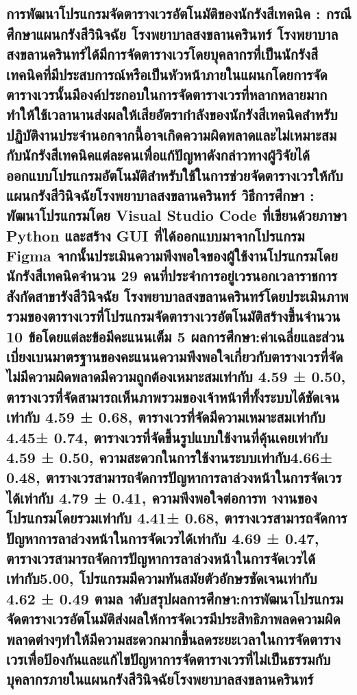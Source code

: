 \hspace{0cm}\subsection{การพัฒนาโปรแกรมจัดตารางเวรอัตโนมัติของนักรังสีเทคนิค : กรณีศึกษาแผนกรังสีวินิจฉัย โรงพยาบาลสงขลานครินทร์ โรงพยาบาลสงขลานครินทร์ได้มีการจัดตารางเวรโดยบุคลากรที่เป็นนักรังสีเทคนิคที่มีประสบการณ์หรือเป็นหัวหน้าภายในแผนกโดยการจัดตารางเวรนั้นมีองค์ประกอบในการจัดตารางเวรที่หลากหลายมากทำให้ใช้เวลานานส่งผลให้เสียอัตรากำลังของนักรังสีเทคนิคสำหรับปฏิบัติงานประจำนอกจากนี้อาจเกิดความผิดพลาดและไม่เหมาะสมกับนักรังสีเทคนิคแต่ละคนเพื่อแก้ปัญหาดังกล่าวทางผู้วิจัยได้ออกแบบโปรแกรมอัตโนมัติสำหรับใช้ในการช่วยจัดตารางเวรให้กับแผนกรังสีวินิจฉัยโรงพยาบาลสงขลานครินทร์ วิธีการศึกษา : พัฒนาโปรแกรมโดย Visual Studio Code ที่เขียนด้วยภาษา Python และสร้าง GUI ที่ได้ออกแบบมาจากโปรแกรม Figma จากนั้นประเมินความพึงพอใจของผู้ใช้งานโปรแกรมโดยนักรังสีเทคนิคจำนวน 29 คนที่ประจำการอยู่เวรนอกเวลาราชการสังกัดสาขารังสีวินิจฉัย โรงพยาบาลสงขลานครินทร์โดยประเมินภาพรวมของตารางเวรที่โปรแกรมจัดตารางเวรอัตโนมัติสร้างขึ้นจำนวน 10 ข้อโดยแต่ละข้อมีคะแนนเต็ม 5 ผลการศึกษา:ค่าเฉลี่ยและส่วนเบี่ยงเบนมาตรฐานของคะแนนความพึงพอใจเกี่ยวกับตารางเวรที่จัดไม่มีความผิดพลาดมีความถูกต้องเหมาะสมเท่ากับ 4.59 ± 0.50, ตารางเวรที่จัดสามารถเห็นภาพรวมของเจ้าหน้าที่ทั้งระบบได้ชัดเจนเท่ากับ 4.59 ± 0.68, ตารางเวรที่จัดมีความเหมาะสมเท่ากับ 4.45± 0.74, ตารางเวรที่จัดขึ้นรูปแบบใช้งานที่คุ้นเคยเท่ากับ 4.59 ± 0.50, ความสะดวกในการใช้งานระบบเท่ากับ4.66± 0.48, ตารางเวรสามารถจัดการปัญหาการลาล่วงหน้าในการจัดเวรได้เท่ากับ 4.79 ± 0.41, ความพึงพอใจต่อการท างานของโปรแกรมโดยรวมเท่ากับ 4.41± 0.68, ตารางเวรสามารถจัดการปัญหาการลาล่วงหน้าในการจัดเวรได้เท่ากับ 4.69 ± 0.47, ตารางเวรสามารถจัดการปัญหาการลาล่วงหน้าในการจัดเวรได้เท่ากับ5.00, โปรแกรมมีความทันสมัยตัวอักษรชัดเจนเท่ากับ 4.62 ± 0.49 ตามล าดับสรุปผลการศึกษา:การพัฒนาโปรแกรมจัดตารางเวรอัตโนมัติส่งผลให้การจัดเวรมีประสิทธิภาพลดความผิดพลาดต่างๆทำให้มีความสะดวกมากขึ้นลดระยะเวลาในการจัดตารางเวรเพื่อป้องกันและแก้ไขปัญหาการจัดตารางเวรที่ไม่เป็นธรรมกับบุคลากรภายในแผนกรังสีวินิจฉัยโรงพยาบาลสงขลานครินทร์ \cite{vijai2}}

